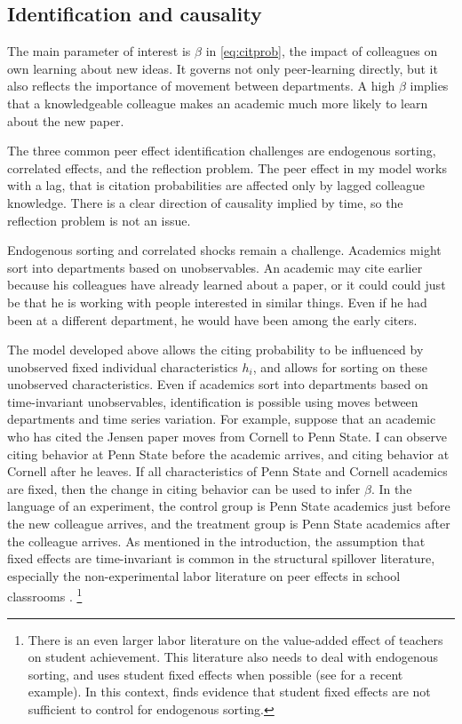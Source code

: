 \documentclass[]{article}
\begin{document}
\subsection{Identification and causality}
\label{sec:ident}

The main parameter of interest is $\beta$ in \eqref{eq:citprob}, the
impact of colleagues on own learning about new ideas. It
governs not only peer-learning directly, but it also reflects the importance 
of movement between departments.  A high $\beta$ implies that a knowledgeable
colleague makes an academic much more likely to learn about the new paper.

The three common peer effect identification challenges are endogenous sorting,
correlated effects, and the reflection problem.  The peer effect in my
model works with a lag, that is citation probabilities are affected only by 
lagged colleague knowledge.  There is a clear direction of 
causality implied by time, so the reflection problem is not an issue.

Endogenous sorting and correlated shocks remain a challenge.  Academics might sort into 
departments based on unobservables. An academic may cite
earlier because his colleagues have already learned about a paper, or it
could could just be that he is working with people interested in
similar things. Even if he had been at a different department, he would
have been among the early citers.

The model developed above allows the citing probability to be influenced
by unobserved fixed individual characteristics $h_i$, and allows for
sorting on these unobserved characteristics. Even if academics sort into
departments based on time-invariant unobservables, identification is
possible using moves between departments and time series variation. For
example, suppose that an academic who has cited the Jensen paper moves from
Cornell to Penn State. I can observe citing behavior at Penn State
before the academic arrives, and
citing behavior at Cornell after he leaves. If all characteristics of
Penn State and Cornell academics are fixed, then the change in citing
behavior can be used to infer $\beta$. In the language of an experiment,
the control group is Penn State academics just before the new colleague
arrives, and the treatment group is Penn State academics after the
colleague arrives.  As mentioned in the introduction, the assumption that 
 fixed effects are time-invariant is common in the structural spillover literature,
 especially the non-experimental labor literature on peer
 effects in school classrooms \citep{bettsa2004peer, arcidiacono2012estimating, burke2013classroom}.
\footnote{
There is an even larger labor literature on the value-added
effect of teachers on student achievement.  This literature also needs
to deal with endogenous sorting, and uses student fixed effects when
possible (see \citet{harris2011teacher} for a recent example).
In this context, \citet{rothstein2010teacher}
finds evidence that student fixed effects are not sufficient to control
for endogenous sorting.}
\end{document}
